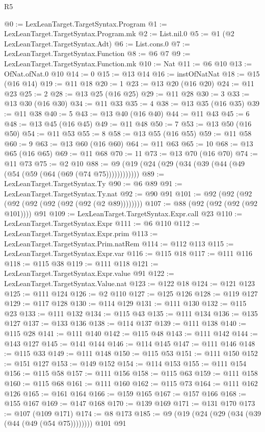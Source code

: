\begin{lexlean}{R5}
\begin{coremodule}
@0 := LexLeanTarget.TargetSyntax.Program
@1 := LexLeanTarget.TargetSyntax.Program.mk
@2 := List.nil.{0}
@5 := @1 (@2 LexLeanTarget.TargetSyntax.Adt)
@6 := List.cons.{0}
@7 := LexLeanTarget.TargetSyntax.Function
@8 := @6 @7
@9 := LexLeanTarget.TargetSyntax.Function.mk
@10 := Nat
@11 := @6 @10
@13 := OfNat.ofNat.{0} @10
@14 := 0
@15 := @13 @14
@16 := instOfNatNat
@18 := @15 (@16 @14)
@19 := @11 @18
@20 := 1
@23 := @13 @20 (@16 @20)
@24 := @11 @23
@25 := 2
@28 := @13 @25 (@16 @25)
@29 := @11 @28
@30 := 3
@33 := @13 @30 (@16 @30)
@34 := @11 @33
@35 := 4
@38 := @13 @35 (@16 @35)
@39 := @11 @38
@40 := 5
@43 := @13 @40 (@16 @40)
@44 := @11 @43
@45 := 6
@48 := @13 @45 (@16 @45)
@49 := @11 @48
@50 := 7
@53 := @13 @50 (@16 @50)
@54 := @11 @53
@55 := 8
@58 := @13 @55 (@16 @55)
@59 := @11 @58
@60 := 9
@63 := @13 @60 (@16 @60)
@64 := @11 @63
@65 := 10
@68 := @13 @65 (@16 @65)
@69 := @11 @68
@70 := 11
@73 := @13 @70 (@16 @70)
@74 := @11 @73
@75 := @2 @10
@88 := @9 (@19 (@24 (@29 (@34 (@39 (@44 (@49 (@54 (@59 (@64 (@69 (@74 @75))))))))))))
@89 := LexLeanTarget.TargetSyntax.Ty
@90 := @6 @89
@91 := LexLeanTarget.TargetSyntax.Ty.nat
@92 := @90 @91
@101 := @92 (@92 (@92 (@92 (@92 (@92 (@92 (@92 (@2 @89))))))))
@107 := @88 (@92 (@92 (@92 (@92 @101)))) @91
@109 := LexLeanTarget.TargetSyntax.Expr.call @23
@110 := LexLeanTarget.TargetSyntax.Expr
@111 := @6 @110
@112 := LexLeanTarget.TargetSyntax.Expr.prim
@113 := LexLeanTarget.TargetSyntax.Prim.natRem
@114 := @112 @113
@115 := LexLeanTarget.TargetSyntax.Expr.var
@116 := @115 @18
@117 := @111 @116
@118 := @115 @38
@119 := @111 @118
@121 := LexLeanTarget.TargetSyntax.Expr.value @91
@122 := LexLeanTarget.TargetSyntax.Value.nat
@123 := @122 @18
@124 := @121 @123
@125 := @111 @124
@126 := @2 @110
@127 := @125 @126
@128 := @119 @127
@129 := @117 @128
@130 := @114 @129
@131 := @111 @130
@132 := @115 @23
@133 := @111 @132
@134 := @115 @43
@135 := @111 @134
@136 := @135 @127
@137 := @133 @136
@138 := @114 @137
@139 := @111 @138
@140 := @115 @28
@141 := @111 @140
@142 := @115 @48
@143 := @111 @142
@144 := @143 @127
@145 := @141 @144
@146 := @114 @145
@147 := @111 @146
@148 := @115 @33
@149 := @111 @148
@150 := @115 @53
@151 := @111 @150
@152 := @151 @127
@153 := @149 @152
@154 := @114 @153
@155 := @111 @154
@156 := @115 @58
@157 := @111 @156
@158 := @115 @63
@159 := @111 @158
@160 := @115 @68
@161 := @111 @160
@162 := @115 @73
@164 := @111 @162 @126
@165 := @161 @164
@166 := @159 @165
@167 := @157 @166
@168 := @155 @167
@169 := @147 @168
@170 := @139 @169
@171 := @131 @170
@173 := @107 (@109 @171)
@174 := @8 @173
@185 := @9 (@19 (@24 (@29 (@34 (@39 (@44 (@49 (@54 @75)))))))) @101 @91

\end{coremodule}
\end{lexlean}
